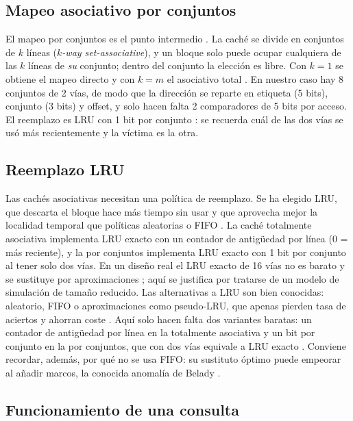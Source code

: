 \documentclass[llncs]{llncs}
\begin{document}
\subsection{Mapeo asociativo por conjuntos}

El mapeo por conjuntos es el punto intermedio \cite{stallings2019}.
La caché se divide en conjuntos de $k$ líneas (\emph{$k$-way
set-associative}), y un bloque solo puede ocupar cualquiera de las
$k$ líneas de \emph{su} conjunto; dentro del conjunto la elección es
libre. Con $k=1$ se obtiene el mapeo directo y con $k=m$ el asociativo
total \cite{stallings2019,patterson2017}. En nuestro caso hay 8
conjuntos de 2 vías, de modo que la dirección se reparte en etiqueta
(5 bits), conjunto (3 bits) y offset, y solo hacen falta 2
comparadores de 5 bits por acceso. El reemplazo es LRU con 1 bit por
conjunto \cite{wikipedia-cpu-cache}: se recuerda cuál de las dos vías se usó
más recientemente y la víctima es la otra.

\subsection{Reemplazo LRU}

Las cachés asociativas necesitan una política de reemplazo. Se ha
elegido LRU, que descarta el bloque hace más tiempo sin usar y que
aprovecha mejor la localidad temporal que políticas aleatorias o FIFO
\cite{stallings2019,hennessy2019,wikipedia-replacement}. La caché totalmente
asociativa
implementa LRU exacto con un contador de antigüedad por línea (0 =
más reciente), y la por conjuntos implementa LRU exacto con 1 bit por
conjunto al tener solo dos vías. En un diseño real el LRU exacto de
16 vías no es barato y se sustituye por aproximaciones
\cite{hennessy2019}; aquí se justifica por tratarse de un modelo de
simulación de tamaño reducido. Las alternativas a LRU son bien
conocidas: aleatorio, FIFO o aproximaciones como pseudo-LRU, que
apenas pierden tasa de aciertos y ahorran coste
\cite{hennessy2019,wikipedia-replacement}. Aquí solo hacen falta dos
variantes baratas: un contador de antigüedad por línea en la
totalmente asociativa y un bit por conjunto en la por conjuntos, que
con dos vías equivale a LRU exacto \cite{wikipedia-cpu-cache}. Conviene
recordar, además, por qué no se usa FIFO: su sustituto óptimo puede
empeorar al añadir marcos, la conocida anomalía de Belady
\cite{belady1969}.

\subsection{Funcionamiento de una consulta}
\end{document}
